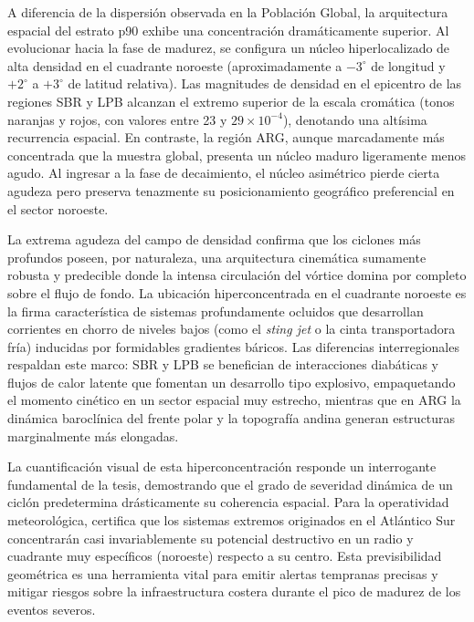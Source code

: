 A diferencia de la dispersión observada en la Población Global, la arquitectura espacial del estrato p90 exhibe una concentración dramáticamente superior. Al evolucionar hacia la fase de madurez, se configura un núcleo hiperlocalizado de alta densidad en el cuadrante noroeste (aproximadamente a $-3^{\circ}$ de longitud y $+2^{\circ}$ a $+3^{\circ}$ de latitud relativa). Las magnitudes de densidad en el epicentro de las regiones SBR y LPB alcanzan el extremo superior de la escala cromática (tonos naranjas y rojos, con valores entre 23 y $29 \times 10^{-4}$), denotando una altísima recurrencia espacial. En contraste, la región ARG, aunque marcadamente más concentrada que la muestra global, presenta un núcleo maduro ligeramente menos agudo. Al ingresar a la fase de decaimiento, el núcleo asimétrico pierde cierta agudeza pero preserva tenazmente su posicionamiento geográfico preferencial en el sector noroeste.

La extrema agudeza del campo de densidad confirma que los ciclones más profundos poseen, por naturaleza, una arquitectura cinemática sumamente robusta y predecible donde la intensa circulación del vórtice domina por completo sobre el flujo de fondo. La ubicación hiperconcentrada en el cuadrante noroeste es la firma característica de sistemas profundamente ocluidos que desarrollan corrientes en chorro de niveles bajos (como el \textit{sting jet} o la cinta transportadora fría) inducidas por formidables gradientes báricos. Las diferencias interregionales respaldan este marco: SBR y LPB se benefician de interacciones diabáticas y flujos de calor latente que fomentan un desarrollo tipo explosivo, empaquetando el momento cinético en un sector espacial muy estrecho, mientras que en ARG la dinámica baroclínica del frente polar y la topografía andina generan estructuras marginalmente más elongadas.

La cuantificación visual de esta hiperconcentración responde un interrogante fundamental de la tesis, demostrando que el grado de severidad dinámica de un ciclón predetermina drásticamente su coherencia espacial. Para la operatividad meteorológica, certifica que los sistemas extremos originados en el Atlántico Sur concentrarán casi invariablemente su potencial destructivo en un radio y cuadrante muy específicos (noroeste) respecto a su centro. Esta previsibilidad geométrica es una herramienta vital para emitir alertas tempranas precisas y mitigar riesgos sobre la infraestructura costera durante el pico de madurez de los eventos severos.

